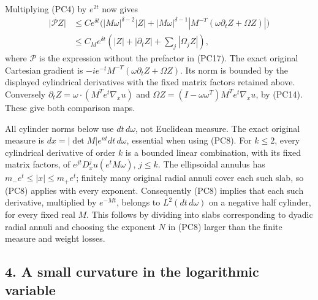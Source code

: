 \documentclass[
  11pt,
]{article}
\makeatletter
\let\ReaderOriginalAnchorStart\hyper@anchorstart
\let\ReaderOriginalAnchorEnd\hyper@anchorend
\let\ReaderPendingAliases\@empty
\def\ReaderArmAliases#1{\gdef\ReaderPendingAliases{#1}}
\def\hyper@anchorstart#1{\ReaderIfNativeAnchorTF{#1}{\ReaderPendingAliases\global\let\ReaderPendingAliases\@empty}{}\ReaderOriginalAnchorStart{#1}}
\makeatother
\begin{document}
Multiplying (PC4) by \(e^{2t}\) now gives \[
\begin{split}
 |\mathcal P Z|&\leq C e^{\delta t}
 \bigl(|M\omega|^{\delta-2}|Z|
 +|M\omega|^{\delta-1}|M^{-T}(\omega\partial_tZ+\Omega Z)|\bigr)\\
 &\leq C_M e^{\delta t}
       (|Z|+|\partial_tZ|+\sum_j|\Omega_jZ|),
 \end{split}
\tag{PC19}
\] where \(\mathcal P\) is the expression without the prefactor in
(PC17). The exact original Cartesian gradient is
\(-ie^{-t}M^{-T}(\omega\partial_tZ+\Omega Z)\). Its norm is bounded by
the displayed cylindrical derivatives with the fixed matrix factors
retained above. Conversely \(\partial_tZ=\omega\cdot(M^Te^t\nabla_xu)\)
and \(\Omega Z=(I-\omega\omega^T)M^Te^t\nabla_xu\), by (PC14). These
give both comparison maps.

All cylinder norms below use \(dt\,d\omega\), not Euclidean measure. The
exact original measure is \(dx=|\det M|e^{nt}dt\,d\omega\), essential
when using (PC8). For \(k\leq2\), every cylindrical derivative of order
\(k\) is a bounded linear combination, with its fixed matrix factors, of
\(e^{jt}D_x^ju(e^tM\omega)\), \(j\leq k\). The ellipsoidal annulus has
\(m_-e^t\leq|x|\leq m_+e^t\); finitely many original radial annuli cover
each such slab, so (PC8) applies with every exponent. Consequently (PC8)
implies that each such derivative, multiplied by \(e^{-Mt}\), belongs to
\(L^2(dt\,d\omega)\) on a negative half cylinder, for every fixed real
\(M\). This follows by dividing into slabs corresponding to dyadic
radial annuli and choosing the exponent \(N\) in (PC8) larger than the
finite measure and weight losses.

\ReaderArmAliases{\ReaderOriginalAnchorStart{AN03-PCU-004}\ReaderOriginalAnchorEnd\begingroup\expandafter\def\csname @currentHref\endcsname{AN03-PCU-004}\label{AN03-PCU-004}\endgroup\ReaderOriginalAnchorStart{an03-pcu-004-a-small-curvature-in-the-logarithmic-variable}\ReaderOriginalAnchorEnd\begingroup\expandafter\def\csname @currentHref\endcsname{an03-pcu-004-a-small-curvature-in-the-logarithmic-variable}\label{an03-pcu-004-a-small-curvature-in-the-logarithmic-variable}\endgroup\ReaderOriginalAnchorStart{4-a-small-curvature-in-the-logarithmic-variable}\ReaderOriginalAnchorEnd\begingroup\expandafter\def\csname @currentHref\endcsname{4-a-small-curvature-in-the-logarithmic-variable}\label{4-a-small-curvature-in-the-logarithmic-variable}\endgroup\ReaderOriginalAnchorStart{a-small-curvature-in-the-logarithmic-variable}\ReaderOriginalAnchorEnd}
\subsection{4. A small curvature in the logarithmic
variable}\label{a-small-curvature-in-the-logarithmic-variable}
\end{document}
